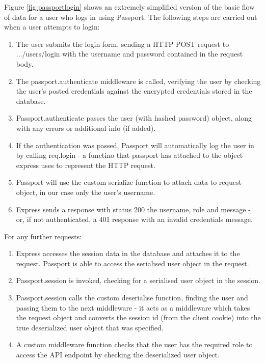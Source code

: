 Figure \ref{fig:passportlogin} shows an extremely simplified version of the basic flow of data for a user who logs in using Passport. The following steps are carried out when a user attempts to login:
\begin{enumerate}
    \item The user submits the login form, sending a HTTP POST request to .../users/login with the username and password contained in the request body.
    \item The passport.authenticate middleware is called, verifying the user by checking the user's posted credentials against the encrypted credentials stored in the database.
    \item Passport.authenticate passes the user (with hashed password) object, along with any errors or additional info (if added).
    \item If the authentication was passed, Passport will automatically log the user in by calling req.login - a functino that passport has attached to the object express uses to represent the HTTP request.
    \item Passport will use the custom serialize function to attach data to request object, in our case only the user's username.
    \item Express sends a response with status 200 the username, role and message - or, if not authenticated, a 401 response with an invalid credentials message.
\end{enumerate}

For any further requests:

\begin{enumerate}
    \item Express accesses the session data in the database and attaches it to the request. Passport is able to access the serialised user object in the request.
    \item Passport.session is invoked, checking for a serialised user object in the session.
    \item Passport.session calls the custom deserialise function, finding the user and passing them to the next middleware - it acts as a middleware which takes the request object and converts the session id (from the client cookie) into the true deserialized user object that was specified.
    \item A custom middleware function checks that the user has the required role to access the API endpoint by checking the deserialized user object.
\end{enumerate} 


